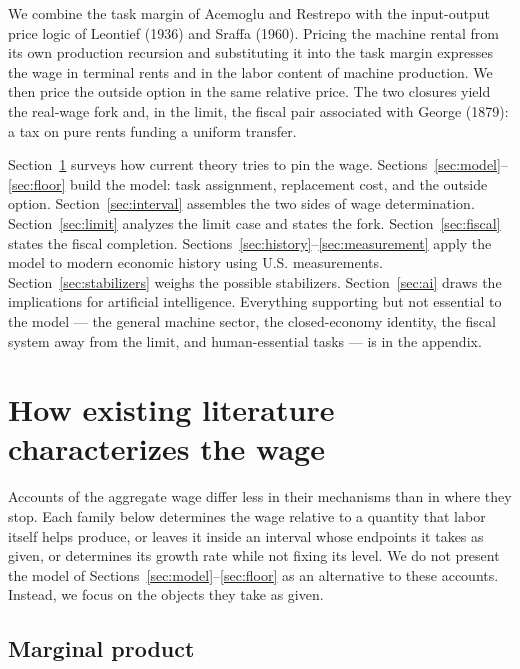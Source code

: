 \documentclass[12pt]{article}
\theoremstyle{plain}
\begin{document}
We combine the task margin of Acemoglu and Restrepo with the input-output price logic of Leontief (1936) and Sraffa (1960). Pricing the machine rental from its own production recursion and substituting it into the task margin expresses the wage in terminal rents and in the labor content of machine production. We then price the outside option in the same relative price. The two closures yield the real-wage fork and, in the limit, the fiscal pair associated with George (1879): a tax on pure rents funding a uniform transfer.

Section~\ref{sec:accounts} surveys how current theory tries to pin the wage.
Sections~\ref{sec:model}--\ref{sec:floor} build the model: task assignment,
replacement cost, and the outside option. Section~\ref{sec:interval} assembles
the two sides of wage determination. Section~\ref{sec:limit} analyzes the limit
case and states the fork. Section~\ref{sec:fiscal} states the fiscal completion.
Sections~\ref{sec:history}--\ref{sec:measurement} apply the model to modern
economic history using U.S. measurements. Section~\ref{sec:stabilizers} weighs
the possible stabilizers. Section~\ref{sec:ai} draws the implications for
artificial intelligence. Everything supporting but not essential to the model
--- the general machine sector, the closed-economy identity, the fiscal system
away from the limit, and human-essential tasks --- is in the appendix.

\section{How existing literature characterizes the wage}\label{sec:accounts}

Accounts of the aggregate wage differ less in their mechanisms than in where they stop. Each family below determines the wage relative to a quantity that labor itself helps produce, or leaves it inside an interval whose endpoints it takes as given, or determines its growth rate while not fixing its level. We do not present the model of Sections~\ref{sec:model}--\ref{sec:floor} as an alternative to these accounts. Instead, we focus on the objects they take as given.

\subsection{Marginal product}\label{sec:marginal-product}
\end{document}
